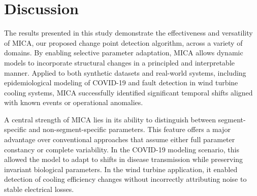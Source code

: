 \documentclass[10pt,letterpaper]{article}
\begin{document}
\begin{table}[h!]
\centering
{}
\caption{Alignment between the four BIC/MDL/AIC change points and turbine status events.}
\label{table:alignment}
\end{table}

\section*{Discussion}
The results presented in this study demonstrate the effectiveness and versatility of MICA, our proposed change point detection algorithm, across a variety of domains. By enabling selective parameter adaptation, MICA allows dynamic models to incorporate structural changes in a principled and interpretable manner. Applied to both synthetic datasets and real-world systems, including epidemiological modeling of COVID-19 and fault detection in wind turbine cooling systems, MICA successfully identified significant temporal shifts aligned with known events or operational anomalies.

A central strength of MICA lies in its ability to distinguish between segment-specific and non-segment-specific parameters. This feature offers a major advantage over conventional approaches that assume either full parameter constancy or complete variability. In the COVID-19 modeling scenario, this allowed the model to adapt to shifts in disease transmission while preserving invariant biological parameters. In the wind turbine application, it enabled detection of cooling efficiency changes without incorrectly attributing noise to stable electrical losses.
\end{document}
